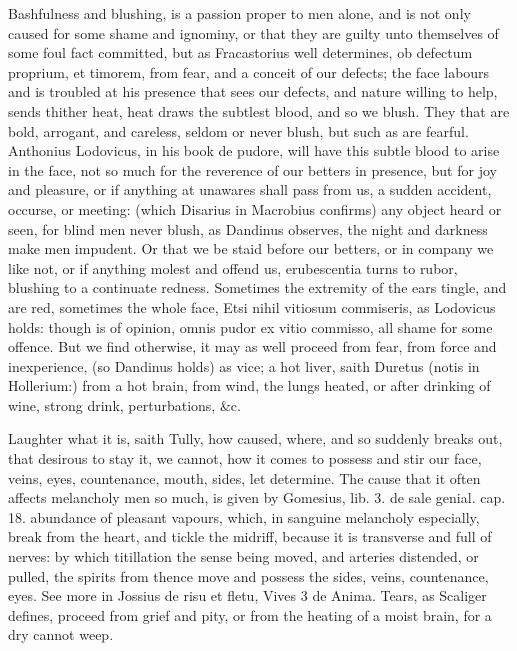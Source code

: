 {Bashfulness and blushing, is a passion proper to men alone, and
is not only caused for some shame and ignominy, or that they are
guilty unto themselves of some foul fact committed, but as
Fracastorius well determines, ob defectum proprium, et timorem,
from fear, and a conceit of our defects; the face labours and is
troubled at his presence that sees our defects, and nature willing to
help, sends thither heat, heat draws the subtlest blood, and so we
blush. They that are bold, arrogant, and careless, seldom or never
blush, but such as are fearful. Anthonius Lodovicus, in his book de
pudore, will have this subtle blood to arise in the face, not so much
for the reverence of our betters in presence, but for joy and
pleasure, or if anything at unawares shall pass from us, a sudden
accident, occurse, or meeting: (which Disarius in  Macrobius
confirms) any object heard or seen, for blind men never blush, as
Dandinus observes, the night and darkness make men impudent. Or that we
be staid before our betters, or in company we like not, or if anything
molest and offend us, erubescentia turns to rubor, blushing to a
continuate redness. Sometimes the extremity of the ears tingle,
and are red, sometimes the whole face, Etsi nihil vitiosum commiseris,
as Lodovicus holds: though \Aristotle{} is of opinion, omnis pudor ex
vitio commisso, all shame for some offence. But we find otherwise, it
may as well proceed from fear, from force and inexperience, (so
Dandinus holds) as vice; a hot liver, saith Duretus (notis in
Hollerium:) from a hot brain, from wind, the lungs heated, or after
drinking of wine, strong drink, perturbations, \&c.

Laughter what it is, saith Tully, how caused, where, and so
suddenly breaks out, that desirous to stay it, we cannot, how it comes
to possess and stir our face, veins, eyes, countenance, mouth, sides,
let \Democritus{} determine. The cause that it often affects melancholy
men so much, is given by Gomesius, lib. 3. de sale genial. cap. 18.
abundance of pleasant vapours, which, in sanguine melancholy
especially, break from the heart, and tickle the midriff, because
it is transverse and full of nerves: by which titillation the sense
being moved, and arteries distended, or pulled, the spirits from thence
move and possess the sides, veins, countenance, eyes. See more in
Jossius de risu et fletu, Vives 3 de Anima. Tears, as Scaliger defines,
proceed from grief and pity, or from the heating of a moist
brain, for a dry cannot weep.

}
